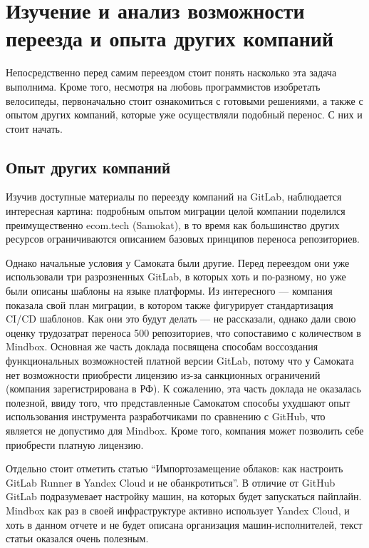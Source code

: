 \chapter{Изучение и анализ возможности переезда и опыта других компаний} \label{ch:ch1}
Непосредственно перед самим переездом стоит понять насколько эта задача выполнима.
Кроме того, несмотря на любовь программистов изобретать велосипеды,
первоначально стоит ознакомиться с готовыми решениями, а также с опытом других компаний,
которые уже осуществляли подобный перенос.
С них и стоит начать.


\section{Опыт других компаний}\label{sec:other-companies-expirience}
Изучив доступные материалы по переезду компаний на GitLab,
наблюдается интересная картина: подробным опытом миграции целой компании поделился преимущественно ecom.tech (Samokat),
в то время как большинство других ресурсов ограничиваются описанием базовых принципов переноса репозиториев.

Однако начальные условия у Самоката были другие.
Перед переездом они уже использовали три разрозненных GitLab, в которых хоть и по-разному, но уже были описаны шаблоны на языке платформы.
Из интересного — компания показала свой план миграции, в котором также фигурирует стандартизация CI/CD шаблонов.
Как они это будут делать — не рассказали, однако дали свою оценку трудозатрат переноса 500 репозиториев, что сопоставимо с количеством в Mindbox.
Основная же часть доклада посвящена способам воссоздания функциональных возможностей платной версии GitLab, потому что у
Самоката нет возможности приобрести лицензию из-за санкционных ограничений (компания зарегистрирована в РФ).
К сожалению, эта часть доклада не оказалась полезной,
ввиду того, что представленные Самокатом способы ухудшают опыт использования инструмента разработчиками по сравнению с GitHub,
что является не допустимо для Mindbox.
Кроме того, компания может позволить себе приобрести платную лицензию.

Отдельно стоит отметить статью \enquote{Импортозамещение облаков: как настроить GitLab Runner в Yandex Cloud и не обанкротиться}.
В отличие от GitHub GitLab подразумевает настройку машин, на которых будет запускаться пайплайн.
Mindbox как раз в своей инфраструктуре активно использует Yandex Cloud, и хоть в данном отчете и не будет описана организация машин-исполнителей,
текст статьи оказался очень полезным.

